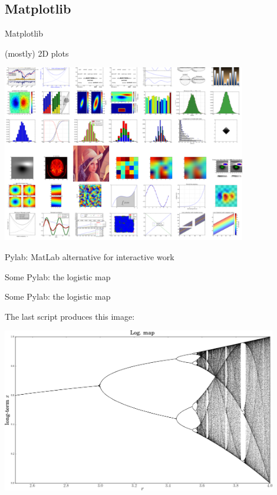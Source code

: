 \subsection{Matplotlib}

\begin{frame}{Matplotlib}

(mostly) 2D plots

\begin{center}
\includegraphics[width=0.8\textwidth]{Figures/mpl}
\end{center}

Pylab: MatLab alternative for interactive work
\end{frame}


\begin{frame}{Some Pylab: the logistic map}

\end{frame}

\begin{frame}{Some Pylab: the logistic map}

The last script produces this image:

\begin{center}
	\includegraphics[width=0.9\textwidth]{Figures/logMap}
\end{center}



\end{frame}

